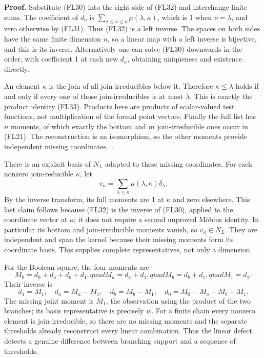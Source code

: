 \documentclass[
  10pt,
]{article}
\begin{document}
\textbf{Proof.} Substitute (FL30) into the right side of (FL32) and
interchange finite sums. The coefficient of \(d_\nu\) is
\(\sum_{\lambda\le\kappa\le\nu}\mu(\lambda,\kappa)\), which is 1 when
\(\nu=\lambda\), and zero otherwise by (FL31). Thus (FL32) is a left
inverse. The spaces on both sides have the same finite dimension \(n\),
so a linear map with a left inverse is bijective, and this is its
inverse. Alternatively one can solve (FL30) downwards in the order, with
coefficient 1 at each new \(d_\kappa\), obtaining uniqueness and
existence directly.

An element \(\kappa\) is the join of all join-irreducibles below it.
Therefore \(\kappa\le\lambda\) holds if and only if every one of those
join-irreducibles is at most \(\lambda\). This is exactly the product
identity (FL33). Products here are products of scalar-valued test
functions, not multiplication of the formal point vectors. Finally the
full list has \(n\) moments, of which exactly the bottom and \(m\)
join-irreducible ones occur in (FL21). The reconstruction is an
isomorphism, so the other moments provide independent missing
coordinates. \(\square\)

There is an explicit basis of \(N_L\) adapted to these missing
coordinates. For each nonzero join-reducible \(\kappa\), let \[
v_\kappa=\sum_{\lambda\le\kappa}\mu(\lambda,\kappa)\delta_\lambda.
\tag{FL34}
\] By the inverse transform, its full moments are 1 at \(\kappa\) and
zero elsewhere. This last claim follows because (FL32) is the inverse of
(FL30), applied to the coordinate vector at \(\kappa\); it does not
require a second unproved Möbius identity. In particular its bottom and
join-irreducible moments vanish, so \(v_\kappa\in N_L\). They are
independent and span the kernel because their missing moments form its
coordinate basis. This supplies complete representatives, not only a
dimension.

For the Boolean square, the four moments are \[
M_0=d_0+d_a+d_b+d_1,quad
M_a=d_a+d_1,quad M_b=d_b+d_1,quad M_1=d_1.
\tag{FL35}
\] Their inverse is \[
d_1=M_1,\quad d_a=M_a-M_1,\quad d_b=M_b-M_1,
\quad d_0=M_0-M_a-M_b+M_1.
\tag{FL36}
\] The missing joint moment is \(M_1\), the observation using the
product of the two branches; its basis representative is precisely
\(w\). For a finite chain every nonzero element is join-irreducible, so
there are no missing moments and the separate thresholds already
reconstruct every linear combination. Thus the linear defect detects a
genuine difference between branching support and a sequence of
thresholds.
\end{document}

